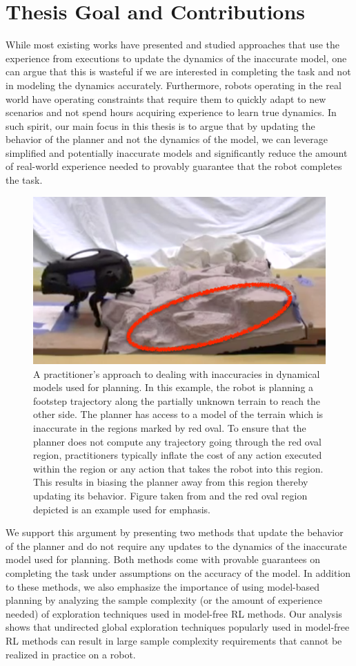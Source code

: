 \section{Thesis Goal and Contributions}
\label{sec:thes-goal-contr}

While most existing works have presented and studied approaches that
use the experience from executions to update the dynamics of the
inaccurate model, one can argue that this is wasteful if we are interested in
completing the task and not in modeling the dynamics
accurately. Furthermore, robots operating in the real world have
operating constraints that require them to quickly adapt to
new scenarios and not spend hours acquiring experience to learn true
dynamics. In such spirit, our main focus in this thesis is to argue that by updating the
behavior of the planner and not the dynamics of the model, we can
leverage simplified and potentially inaccurate models and
significantly reduce the amount of real-world experience needed to
provably guarantee that the robot completes the task.

\begin{figure}[t]
  \centering
  \includegraphics[width=0.5\linewidth]{Figures/intro/zucker}
  \caption{A practitioner's approach to dealing with inaccuracies in
    dynamical models used for planning. In this example, the robot is
    planning a footstep trajectory along the partially unknown terrain
  to reach the other side. The planner has access to a model of the
  terrain which is inaccurate in the regions marked by red oval. To
  ensure that the planner does not compute any trajectory going
  through the red oval region, practitioners typically inflate the
  cost of any action executed within the region or any action that
  takes the robot into this region. This results in biasing the
  planner away from this region thereby updating its behavior. Figure
  taken from \cite{DBLP:journals/ijrr/ZuckerRSCBAK11} and the red oval
  region depicted is an example used for emphasis.}
\label{fig:zucker}
\end{figure}

We support this argument by presenting two methods that update the
behavior of the planner and do not require any updates to the dynamics
of the inaccurate model used for planning.  Both methods come with
provable guarantees on completing the task under assumptions on the
accuracy of the model. In addition to these methods, we also emphasize
the importance of using model-based planning
by analyzing the sample complexity (or the amount of experience
needed) of exploration techniques used in model-free RL methods. Our
analysis shows that undirected global exploration techniques popularly
used in model-free RL methods can result in large sample complexity
requirements that cannot be realized in practice on a robot.

